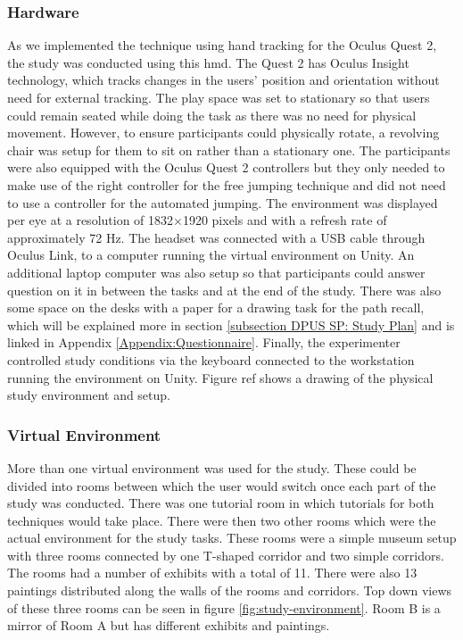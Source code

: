 \subsubsection{Hardware}
\label{subsubsection DPUS SP SS: Hardware}
As we implemented the technique using hand tracking for the Oculus Quest 2, the study was conducted using this \acrshort{hmd}. The Quest 2 has Oculus Insight technology, which tracks changes in the users' position and orientation without need for external tracking. The play space was set to stationary so that users could remain seated while doing the task as there was no need for physical movement. However, to ensure participants could physically rotate, a revolving chair was setup for them to sit on rather than a stationary one. The participants were also equipped with the Oculus Quest 2 controllers but they only needed to make use of the right controller for the free jumping technique and did not need to use a controller for the automated jumping. The environment was displayed per eye at a resolution of 1832×1920 pixels and with a refresh rate of approximately 72 Hz. The headset was connected with a USB cable through Oculus Link, to a computer running the virtual environment on Unity. An additional laptop computer was also setup so that participants could answer question on it in between the tasks and at the end of the study. There was also some space on the desks with a paper for a drawing task for the path recall, which will be explained more in section \ref{subsection DPUS SP: Study Plan} and is linked in Appendix \ref*{Appendix:Questionnaire}. Finally, the experimenter controlled study conditions via the keyboard connected to the workstation running the environment on Unity. Figure ref shows a drawing of the physical study environment and setup.
 
\subsubsection{Virtual Environment}
\label{subsubsection DPUS SP SS: Virtual Environment} 
More than one virtual environment was used for the study. These could be divided into rooms between which the user would switch once each part of the study was conducted. There was one tutorial room in which tutorials for both techniques would take place. There were then two other rooms which were the actual environment for the study tasks. These rooms were a simple museum setup with three rooms connected by one T-shaped corridor and two simple corridors. The rooms had a number of exhibits with a total of 11. There were also 13 paintings distributed along the walls of the rooms and corridors. Top down views of these three rooms can be seen in figure \ref{fig:study-environment}. Room B is a mirror of Room A but has different exhibits and paintings.

